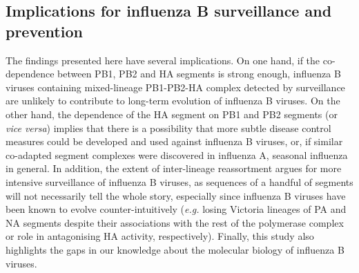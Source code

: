 \documentclass[11pt,oneside,letterpaper]{article}
\begin{document}
\subsection*{Implications for influenza B surveillance and prevention}
The findings presented here have several implications.
On one hand, if the co-dependence between PB1, PB2 and HA segments is strong enough, influenza B viruses containing mixed-lineage PB1-PB2-HA complex detected by surveillance are unlikely to contribute to long-term evolution of influenza B viruses.
On the other hand, the dependence of the HA segment on PB1 and PB2 segments (or \textit{vice versa}) implies that there is a possibility that more subtle disease control measures could be developed and used against influenza B viruses, or, if similar co-adapted segment complexes were discovered in influenza A, seasonal influenza in general.
In addition, the extent of inter-lineage reassortment argues for more intensive surveillance of influenza B viruses, as sequences of a handful of segments will not necessarily tell the whole story, especially since influenza B viruses have been known to evolve counter-intuitively (\textit{e.g.} losing Victoria lineages of PA and NA segments despite their associations with the rest of the polymerase complex or role in antagonising HA activity, respectively).
Finally, this study also highlights the gaps in our knowledge about the molecular biology of influenza B viruses.







\end{document}
